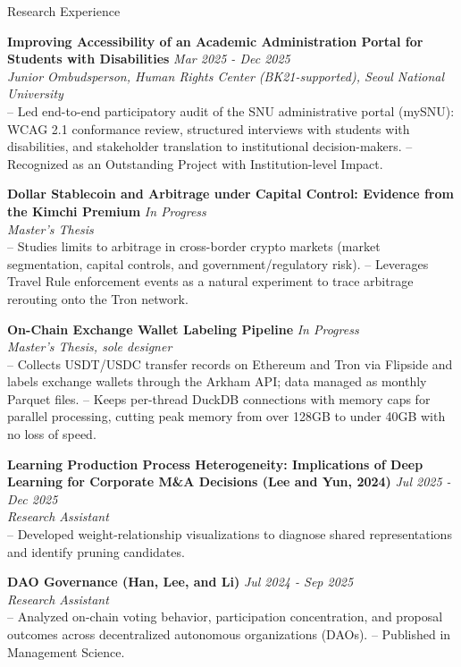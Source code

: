 \documentclass{resume} %
\begin{document}
\begin{rSection}{Research Experience}

{\bf Improving Accessibility of an Academic Administration Portal for Students with Disabilities} \hfill {\em Mar 2025 - Dec 2025}
\\ { \textit {Junior Ombudsperson, Human Rights Center (BK21-supported), Seoul National University}} \\
-- Led end-to-end participatory audit of the SNU administrative portal (mySNU): WCAG 2.1 conformance review, structured interviews with students with disabilities, and stakeholder translation to institutional decision-makers.
-- Recognized as an Outstanding Project with Institution-level Impact.

{\bf Dollar Stablecoin and Arbitrage under Capital Control: Evidence from the Kimchi Premium} \hfill {\em In Progress}
\\ { \textit {Master's Thesis}} \\
-- Studies limits to arbitrage in cross-border crypto markets (market segmentation, capital controls, and government/regulatory risk).
-- Leverages Travel Rule enforcement events as a natural experiment to trace arbitrage rerouting onto the Tron network.

{\bf On-Chain Exchange Wallet Labeling Pipeline} \hfill {\em In Progress}
\\ { \textit {Master's Thesis, sole designer}} \\
-- Collects USDT/USDC transfer records on Ethereum and Tron via Flipside and labels exchange wallets through the Arkham API; data managed as monthly Parquet files.
-- Keeps per-thread DuckDB connections with memory caps for parallel processing, cutting peak memory from over 128GB to under 40GB with no loss of speed.

{\bf Learning Production Process Heterogeneity: Implications of Deep Learning for Corporate M\&A Decisions (Lee and Yun, 2024)} \hfill {\em Jul 2025 - Dec 2025}
\\ { \textit {Research Assistant}} \\
-- Developed weight-relationship visualizations to diagnose shared representations and identify pruning candidates.


{\bf DAO Governance (Han, Lee, and Li)} \hfill {\em Jul 2024 - Sep 2025}
\\ { \textit {Research Assistant}} \\
-- Analyzed on-chain voting behavior, participation concentration, and proposal outcomes across decentralized autonomous organizations (DAOs).
-- Published in Management Science.


\end{rSection}
\end{document}

